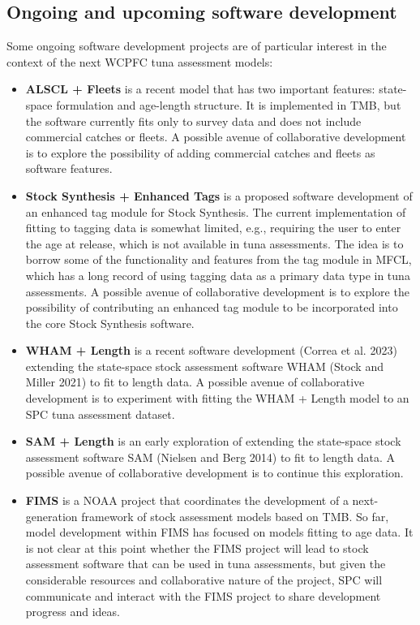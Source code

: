 \documentclass{SCreport}
\begin{document}
\subsection{Ongoing and upcoming software development}
\label{sec:ongoing-upcoming-development}

Some ongoing software development projects are of particular interest in the
context of the next WCPFC tuna assessment models:

\begin{itemize}
  \item \textbf{ALSCL + Fleets} is a recent model that has two important
  features: state-space formulation and age-length structure. It is implemented
  in TMB, but the software currently fits only to survey data and does not
  include commercial catches or fleets. A possible avenue of collaborative
  development is to explore the possibility of adding commercial catches and
  fleets as software features.
  \item \textbf{Stock Synthesis + Enhanced Tags} is a proposed software
  development of an enhanced tag module for Stock Synthesis. The current
  implementation of fitting to tagging data is somewhat limited, e.g., requiring
  the user to enter the age at release, which is not available in tuna
  assessments. The idea is to borrow some of the functionality and features from
  the tag module in MFCL, which has a long record of using tagging data as a
  primary data type in tuna assessments. A possible avenue of collaborative
  development is to explore the possibility of contributing an enhanced tag
  module to be incorporated into the core Stock Synthesis software.
  \item \textbf{WHAM + Length} is a recent software development (Correa et al.
  2023) extending the state-space stock assessment software WHAM (Stock and
  Miller 2021) to fit to length data. A possible avenue of collaborative
  development is to experiment with fitting the WHAM + Length model to an SPC
  tuna assessment dataset.
  \item \textbf{SAM + Length} is an early exploration of extending the
  state-space stock assessment software SAM (Nielsen and Berg 2014) to fit to
  length data. A possible avenue of collaborative development is to continue
  this exploration.
  \item \textbf{FIMS} is a NOAA project that coordinates the development of a
  next-generation framework of stock assessment models based on TMB. So far,
  model development within FIMS has focused on models fitting to age data. It is
  not clear at this point whether the FIMS project will lead to stock assessment
  software that can be used in tuna assessments, but given the considerable
  resources and collaborative nature of the project, SPC will communicate and
  interact with the FIMS project to share development progress and ideas.
\end{itemize}
\end{document}
